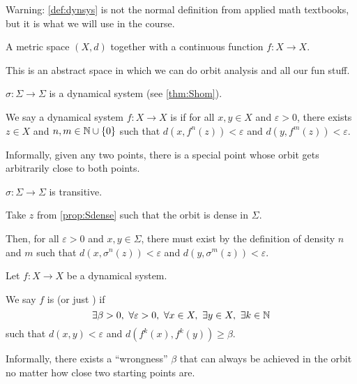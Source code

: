 \documentclass[class=pmath370,tikz,notes]{agony}
\begin{document}
Warning: \cref{def:dynsys} is not the normal definition from applied math textbooks,
but it is what we will use in the course.

\begin{defn}
  A metric space $(X,d)$ together with a continuous function $f : X \to X$.
  \label{def:dynsys}
\end{defn}

This is an abstract space in which we can do orbit analysis and all our fun stuff.

\begin{example}
  $\sigma : \Sigma \to \Sigma$ is a dynamical system (see \cref{thm:Shom}).
\end{example}

\begin{defn}[transitivity]
  We say a dynamical system $f : X \to X$ is 
  if for all $x,y \in X$ and $\varepsilon > 0$,
  there exists $z \in X$ and $n,m \in \mathbb{N} \cup \{0\}$
  such that $d(x,f^n(z)) < \varepsilon$ and $d(y,f^m(z)) < \varepsilon$.
\end{defn}

Informally, given any two points, there is a special point whose orbit
gets arbitrarily close to both points.

\begin{prop}\label{prop:Strans}
  $\sigma : \Sigma \to \Sigma$ is transitive.
\end{prop}
\begin{prf}
  Take $z$ from \cref{prop:Sdense} such that the orbit is dense in $\Sigma$.

  Then, for all $\varepsilon > 0$ and $x,y \in \Sigma$,
  there must exist by the definition of density $n$ and $m$ such that
  $d(x,\sigma^n(z)) < \varepsilon$ and $d(y,\sigma^m(z)) < \varepsilon$.
\end{prf}

\begin{defn*}
  Let $f : X \to X$ be a dynamical system.

  We say $f$ is 
  (or just ) if
  \[ \exists \beta > 0,\ \forall \varepsilon > 0,\ \forall x \in X,\ \exists y \in X,\ \exists k \in \N \]
  such that $d(x,y) < \varepsilon$ and $d(f^k(x),f^k(y)) \geq \beta$.
\end{defn*}

Informally, there exists a ``wrongness'' $\beta$ that can always be
achieved in the orbit no matter how close two starting points are.
\end{document}
